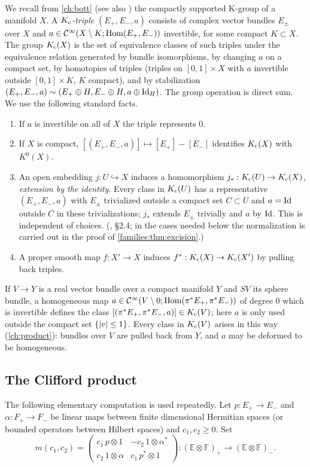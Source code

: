 We recall from \cref{ch:bott} (see also \cite{Atiyah-K}) the compactly supported
K-group of a manifold $X$. A \emph{$K_{\mathrm{c}}$-triple} $(E_+,E_-,a)$ consists of
complex vector bundles $E_\pm$ over $X$ and
$a\in\mathcal{C}^\infty(X\setminus K;\operatorname{Hom}(E_+,E_-))$ invertible, for some compact $K\subset X$.
The group $K_{\mathrm{c}}(X)$ is the set of equivalence classes of such triples under the
equivalence relation generated by bundle isomorphisms, by changing $a$ on a
compact set, by homotopies of triples (triples on $[0,1]\times X$ with $a$
invertible outside $[0,1]\times K$, $K$ compact), and by stabilization
$(E_+,E_-,a)\sim(E_+\oplus H,E_-\oplus H,a\oplus\operatorname{Id}_H)$. The group operation is
direct sum. We use the following standard facts.
\begin{enumerate}[label=(K\arabic*)]
\item\label{families:K-degenerate} If $a$ is invertible on all of $X$ the
  triple represents $0$.
\item\label{families:K-compact} If $X$ is compact, $[(E_+,E_-,a)]\mapsto
  [E_+]-[E_-]$ identifies $K_{\mathrm{c}}(X)$ with $K^0(X)$.
\item\label{families:K-open} An open embedding $j:U\hookrightarrow X$ induces a
  homomorphism $j_*:K_{\mathrm{c}}(U)\to K_{\mathrm{c}}(X)$, \emph{extension by the identity}. Every
  class in $K_{\mathrm{c}}(U)$ has a representative $(E_+,E_-,a)$ with $E_\pm$ trivialized
  outside a compact set $C\subset U$ and $a=\operatorname{Id}$ outside $C$ in these
  trivializations; $j_*$ extends $E_\pm$ trivially and $a$ by $\operatorname{Id}$. This is
  independent of choices. (\cite{Atiyah-K}, \S2.4; in the cases needed below
  the normalization is carried out in the proof of \cref{families:thm:excision}.)
\item\label{families:K-pullback} A proper smooth map $f:X'\to X$ induces
  $f^*:K_{\mathrm{c}}(X)\to K_{\mathrm{c}}(X')$ by pulling back triples.
\end{enumerate}
If $V\to Y$ is a real vector bundle over a compact manifold $Y$ and $SV$ its
sphere bundle, a homogeneous map $a\in\mathcal{C}^\infty(V\setminus0;\operatorname{Hom}(\pi^*E_+,\pi^*E_-))$
of degree $0$ which is invertible defines the class
$[(\pi^*E_+,\pi^*E_-,a)]\in K_{\mathrm{c}}(V)$; here $a$ is only used outside the compact
set $\{\lvert v\rvert\le1\}$. Every class in $K_{\mathrm{c}}(V)$ arises in this way
(\cref{ch:product}): bundles over $V$ are pulled back from $Y$, and $a$ may be
deformed to be homogeneous.

\subsection{The Clifford product}
The following elementary computation is used repeatedly. Let $p:E_+\to E_-$
and $\alpha:F_+\to F_-$ be linear maps between finite dimensional Hermitian
spaces (or bounded operators between Hilbert spaces) and $c_1,c_2\ge0$. Set
\begin{equation}\label{families:eq:clifford}
  m(c_1,c_2)=\begin{pmatrix}c_1\,p\otimes1&-c_2\,1\otimes\alpha^*\\
  c_2\,1\otimes\alpha&c_1\,p^*\otimes1\end{pmatrix}:
  (\mathbb E\otimes\mathbb F)_+\longrightarrow(\mathbb E\otimes\mathbb F)_-.
\end{equation}

